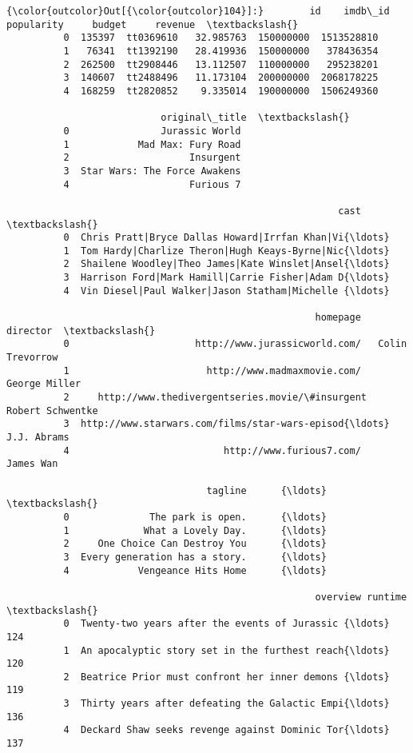 \documentclass[11pt]{article}
\begin{document}
\begin{Verbatim}[commandchars=\\\{\}]
{\color{outcolor}Out[{\color{outcolor}104}]:}        id    imdb\_id  popularity     budget     revenue  \textbackslash{}
          0  135397  tt0369610   32.985763  150000000  1513528810   
          1   76341  tt1392190   28.419936  150000000   378436354   
          2  262500  tt2908446   13.112507  110000000   295238201   
          3  140607  tt2488496   11.173104  200000000  2068178225   
          4  168259  tt2820852    9.335014  190000000  1506249360   
          
                           original\_title  \textbackslash{}
          0                Jurassic World   
          1            Mad Max: Fury Road   
          2                     Insurgent   
          3  Star Wars: The Force Awakens   
          4                     Furious 7   
          
                                                          cast  \textbackslash{}
          0  Chris Pratt|Bryce Dallas Howard|Irrfan Khan|Vi{\ldots}   
          1  Tom Hardy|Charlize Theron|Hugh Keays-Byrne|Nic{\ldots}   
          2  Shailene Woodley|Theo James|Kate Winslet|Ansel{\ldots}   
          3  Harrison Ford|Mark Hamill|Carrie Fisher|Adam D{\ldots}   
          4  Vin Diesel|Paul Walker|Jason Statham|Michelle {\ldots}   
          
                                                      homepage          director  \textbackslash{}
          0                      http://www.jurassicworld.com/   Colin Trevorrow   
          1                        http://www.madmaxmovie.com/     George Miller   
          2     http://www.thedivergentseries.movie/\#insurgent  Robert Schwentke   
          3  http://www.starwars.com/films/star-wars-episod{\ldots}       J.J. Abrams   
          4                           http://www.furious7.com/         James Wan   
          
                                   tagline      {\ldots}       \textbackslash{}
          0              The park is open.      {\ldots}        
          1             What a Lovely Day.      {\ldots}        
          2     One Choice Can Destroy You      {\ldots}        
          3  Every generation has a story.      {\ldots}        
          4            Vengeance Hits Home      {\ldots}        
          
                                                      overview runtime  \textbackslash{}
          0  Twenty-two years after the events of Jurassic {\ldots}     124   
          1  An apocalyptic story set in the furthest reach{\ldots}     120   
          2  Beatrice Prior must confront her inner demons {\ldots}     119   
          3  Thirty years after defeating the Galactic Empi{\ldots}     136   
          4  Deckard Shaw seeks revenge against Dominic Tor{\ldots}     137   
          

\end{Verbatim}
\end{document}
